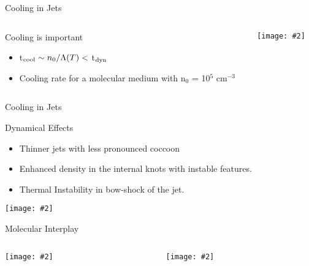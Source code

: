 \documentclass[8pt,xcolor=dvipsnames]{beamer}
\newcommand{\figpath}{./NEWFIGS/}
\newcommand{\spic}[2]{\texttt{[image: \#2]}}
\newcommand{\myref}[1]{{\small{\color{red}{(#1)}}}}
\begin{document}
\begin{frame}{Cooling in Jets}
\begin{columns}
\begin{column}{0.3\textwidth}
\vspace{-3cm}
\begin{block}{Cooling is important}
\begin{itemize}
\item t$_{\rm cool} \sim n_0/\Lambda(T) <$ t$_{\rm dyn}$
  \myref{e.g, Blondin, 1990}\\
\item Cooling rate for a molecular medium with n$_0$ = 10$^{5}$ cm$^{-3}$
\end{itemize}
\end{block}
\end{column}
\begin{column}{0.6\textwidth}
\spic{0.3}{\figpath/pfig1.pdf}
\end{column}
\end{columns}
\end{frame}

\begin{frame}{Cooling in Jets}
\begin{block}{Dynamical Effects}
\centering
\begin{itemize}
\item Thinner jets with less pronounced coccoon
\item Enhanced density in the internal knots with instable features.
\item Thermal Instability in bow-shock of the jet. 
\end{itemize}
\end{block}
\centering
\spic{0.23}{\figpath/pfig4.pdf}

\end{frame}

\begin{frame}{Molecular Interplay}
\begin{columns}
\begin{column}{0.4\textwidth}
\spic{0.2}{\figpath/pfig6.pdf}
\end{column}
\hfill
\begin{column}{0.6\textwidth}
\spic{0.2}{\figpath/pfig7.pdf}
\end{column}
\end{columns}
\end{frame}
\end{document}
